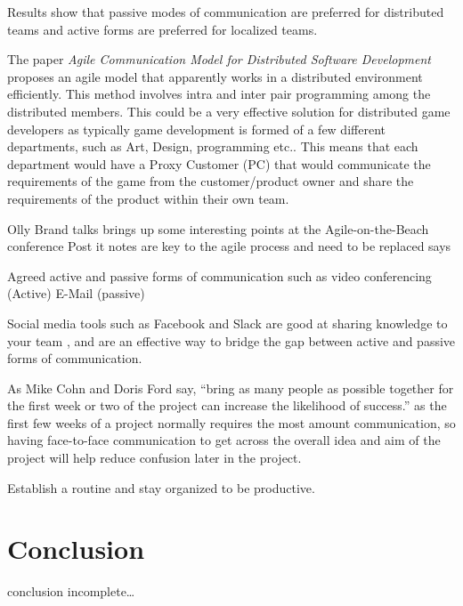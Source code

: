 \documentclass{scrartcl}
\begin{document}
Results show that passive modes of communication are preferred for distributed teams and active forms are preferred for localized teams. \cite{joshi2013}


The paper \textit{Agile Communication Model for Distributed Software Development} \cite{bhalerao2010} proposes an agile model that apparently works in a distributed environment efficiently. This method involves intra and inter pair programming among the distributed members. This could be a very effective solution for distributed game developers as typically game development is formed of a few different departments, such as Art, Design, programming etc.. This means that each department would have a Proxy Customer (PC) that would communicate the requirements of the game from the customer/product owner and share the requirements of the product within their own team. 




Olly Brand talks brings up some interesting points at the Agile-on-the-Beach conference \cite{OllyBrandLiveBlog2015}
Post it notes are key to the agile process and need to be replaced says 

Agreed active and passive forms of communication such as video conferencing (Active) E-Mail (passive) \cite{joshi2013}

Social media tools such as Facebook and Slack are good at sharing knowledge to your team \cite{OllyBrandLiveBlog2015}, and are an effective way to bridge the gap between active and passive forms of communication.

As Mike Cohn and Doris Ford say, ``bring as many people as possible together for the first week or two of the project can increase the likelihood of success.'' \cite{cohn2003} as the first few weeks of a project normally requires the most amount communication, so having face-to-face communication to get across the overall idea and aim of the project will help reduce confusion later in the project.

Establish a routine and stay organized to be productive. \cite{OllyBrandLiveBlog2015}

\section{Conclusion}

conclusion incomplete\ldots




\end{document}
